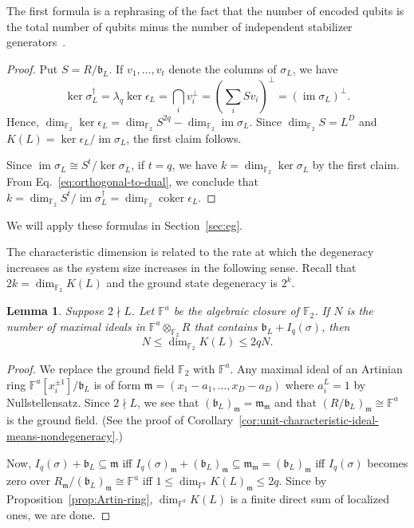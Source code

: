 \documentclass[letterpaper,12pt]{amsart}
\newtheorem{lem}{Lemma}[section]
\theoremstyle{definition} \newtheorem{defn}{Definition}
\theoremstyle{definition} \newtheorem{rem}{Remark}
\theoremstyle{definition} \newtheorem{example}{Example}
\newcommand{\im}{\mathop{\mathrm{im}}}
\newcommand{\coker}{\mathop{\mathrm{coker}}}
\newcommand{\FF}{\mathbb{F}}
\newcommand{\mm}{\mathfrak{m}}
\newcommand{\bb}{\mathfrak{b}}
\begin{document}
\noindent
The first formula is a rephrasing of the fact that the number of encoded qubits
is the total number of qubits minus the number of independent stabilizer 
generators~\cite{Gottesman1996Saturating,CalderbankRainsShorEtAl1997Quantum}.
\begin{proof}
Put $S = R/\bb_L$. 
If $v_1,\ldots, v_t$ denote the columns of $\sigma_L$, we have
\begin{equation}
\ker \sigma_L^\dagger = \lambda_q \ker \epsilon_L 
= \bigcap_i v_i^\perp = \left( \sum_i S v_i \right)^\perp = \left( \im \sigma_L \right)^\perp.
\label{eq:orthogonal-to-dual}
\end{equation}
Hence, $\dim_{\FF_2} \ker \epsilon_L = \dim_{\FF_2} S^{2q} - \dim_{\FF_2} \im \sigma_L.$
Since $\dim_{\FF_2} S = L^D$ and $K(L) = \ker \epsilon_L / \im \sigma_L$,
the first claim follows.

Since $\im \sigma_L \cong S^t / \ker \sigma_L$, if $t=q$,
we have $k = \dim_{\FF_2} \ker \sigma_L$ by the first claim.
From Eq.~\eqref{eq:orthogonal-to-dual}, we conclude that 
$k = \dim_{\FF_2} S^t / \im \sigma_L^\dagger = \dim_{\FF_2} \coker \epsilon_L$.
\end{proof}
\noindent We will apply these formulas in Section~\ref{sec:eg}.

The characteristic dimension is related to the rate at which
the degeneracy increases as the system size increases
in the following sense.
Recall that $2k = \dim_{\FF_2} K(L)$ and the ground state degeneracy is $2^k$.
\begin{lem}
Suppose $2 \nmid L$. Let $\FF^a$ be the algebraic closure of $\FF_2$.
If $N$ is the number of maximal ideals in $\FF^a \otimes_{\FF_2} R$ 
that contains $\bb_L + I_q(\sigma)$, 
then
\[
N \le \dim_{\FF_2} K(L) \le 2q N.
\]
\label{lem:K-L-number-points}
\end{lem}
\begin{proof}
We replace the ground field $\FF_2$ with $\FF^a$.
Any maximal ideal of an Artinian ring $\FF^a[x_i^{\pm 1}]/\bb_L$ is of form
$\mm = (x_1 - a_1, \ldots, x_D - a_D)$ where $a_i^L = 1$ by Nullstellensatz.
Since $2 \nmid L$, we see that $(\bb_L)_\mm = \mm_\mm$ 
and that $(R/\bb_L)_\mm \cong \FF^a$ is the ground field.
(See the proof of Corollary~\ref{cor:unit-characteristic-ideal-means-nondegeneracy}.)

Now, $I_q(\sigma) + \bb_L \subseteq \mm$
iff $I_q(\sigma)_\mm + (\bb_L)_\mm \subseteq \mm_\mm = (\bb_L)_\mm$
iff $I_q(\sigma)$ becomes zero over $R_\mm / (\bb_L)_\mm \cong \FF^a$
iff $1 \le \dim_{\FF^a} K(L)_\mm \le 2q$.
Since by Proposition~\ref{prop:Artin-ring},
$\dim_{\FF^a} K(L)$ is a finite direct sum of localized ones,
we are done.
\end{proof}
\end{document}
